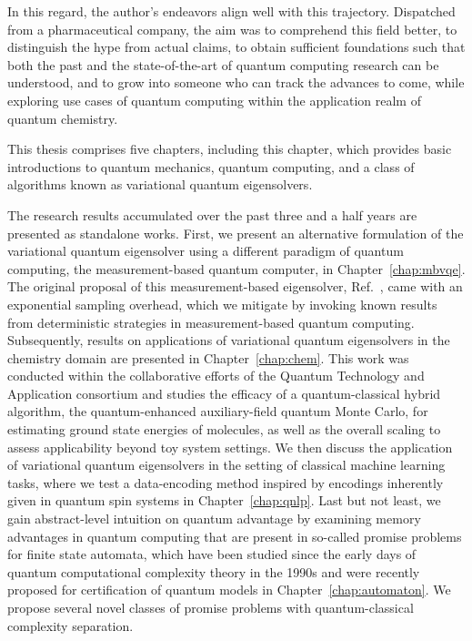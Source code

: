 \documentclass[../main.tex]{subfiles}
\begin{document}
In this regard, the author's endeavors align well with this trajectory. Dispatched from a pharmaceutical company, the aim was to comprehend this field better, to distinguish the hype from actual claims, to obtain sufficient foundations such that both the past and the state-of-the-art of quantum computing research can be understood, and to grow into someone who can track the advances to come, while exploring use cases of quantum computing within the application realm of quantum chemistry.

This thesis comprises five chapters, including this chapter, which provides basic introductions to quantum mechanics, quantum computing, and a class of algorithms known as variational quantum eigensolvers.

The research results accumulated over the past three and a half years are presented as standalone works. First, we present an alternative formulation of the variational quantum eigensolver using a different paradigm of quantum computing, the measurement-based quantum computer, in Chapter~\ref{chap:mbvqe}. The original proposal of this measurement-based eigensolver, Ref.~\cite{ferguson2021measurement}, came with an exponential sampling overhead, which we mitigate by invoking known results from deterministic strategies in measurement-based quantum computing.
Subsequently, results on applications of variational quantum eigensolvers in the chemistry domain are presented in Chapter~\ref{chap:chem}. This work was conducted within the collaborative efforts of the Quantum Technology and Application consortium and studies the efficacy of a quantum-classical hybrid algorithm, the quantum-enhanced auxiliary-field quantum Monte Carlo, for estimating ground state energies of molecules, as well as the overall scaling to assess applicability beyond toy system settings.
We then discuss the application of variational quantum eigensolvers in the setting of classical machine learning tasks, where we test a data-encoding method inspired by encodings inherently given in quantum spin systems in Chapter~\ref{chap:qnlp}. 
Last but not least, we gain abstract-level intuition on quantum advantage by examining memory advantages in quantum computing that are present in so-called promise problems for finite state automata, which have been studied since the early days of quantum computational complexity theory in the 1990s and were recently proposed for certification of quantum models in Chapter~\ref{chap:automaton}. We propose several novel classes of promise problems with quantum-classical complexity separation.
\end{document}
